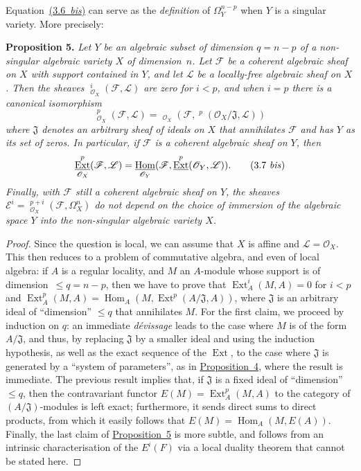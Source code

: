 \documentclass{article}
\newenvironment{itenv}[1]
  {\phantomsection\par\medskip\noindent\textbf{#1.}\itshape}
  {\medskip}
\newcommand{\scr}[1]{{\mathscr{#1}}}
\renewcommand{\leq}{\leqslant}
\DeclareMathOperator{\Ext}{Ext}
\DeclareMathOperator{\Hom}{Hom}
\DeclareMathOperator{\shExt}{\underline{Ext}}
\DeclareMathOperator{\shHom}{\underline{Hom}}
\newcommand{\oldpage}[1]{\marginpar{\footnotesize$\Big\vert$ \textit{p.~#1}}}
\begin{document}
Equation~\hyperref[3.6bis]{(3.6~\emph{bis})} can serve as the \emph{definition} of $\Omega_Y^{n-p}$ when $Y$ is a singular variety.
More precisely:

\begin{itenv}{Proposition 5}
\label{proposition5}
  Let $Y$ be an algebraic subset of dimension $q=n-p$ of a non-singular algebraic variety $X$ of dimension~$n$.
  Let $\scr{F}$ be a coherent algebraic sheaf on $X$ with support contained in $Y$, and let $\scr{L}$ be a locally-free algebraic sheaf on $X$.
  Then the sheaves $\shExt_{\scr{O}_X}^i(\scr{F},\scr{L})$ are zero for $i<p$, and when $i=p$ there is a canonical isomorphism
  \[
  \label{3.7}
    \shExt_{\scr{O}_X}^p(\scr{F},\scr{L}) = \shHom_{\scr{O}_X}(\scr{F},\shExt^p(\scr{O}_X/\mathfrak{J},\scr{L}))
  \tag{3.7}
  \]
  where $\mathfrak{J}$ denotes an arbitrary sheaf of ideals on $X$ that annihilates $\scr{F}$ and has $Y$ as its set of zeros.
  In particular, if $\scr{F}$ is a coherent algebraic sheaf on $Y$, then
  \[
  \label{3.7bis}
    \shExt_{\scr{O}_X}^p(\scr{F},\scr{L}) = \shHom_{\scr{O}_Y}(\scr{F},\shExt^p(\scr{O}_Y,\scr{L})).
  \tag{3.7 \emph{bis}}
  \]
  Finally, with $\scr{F}$ still a coherent algebraic sheaf on $Y$, the sheaves $\scr{E}^i=\shExt_{\scr{O}_X}^{p+i}(\scr{F},\Omega_X^n)$ do not depend on the choice of immersion of the algebraic space $Y$ into the non-singular algebraic variety $X$.
\end{itenv}

\begin{proof}
  Since the question is local, we can assume that $X$ is affine and $\scr{L}=\scr{O}_X$.
  This then reduces to a problem of commutative algebra, and even of local algebra:
  if $A$ is a regular locality, and $M$ an $A$-module whose support is of dimension~$\leq q=n-p$, then we have to prove that $\Ext_A^i(M,A)=0$ for $i<p$ and $\Ext_A^p(M,A)=\Hom_A(M,\Ext^p(A/\mathfrak{J},A))$, where $\mathfrak{J}$ is an arbitrary ideal of ``dimension'' $\leq q$ that annihilates $M$.
  For the first claim, we proceed by induction on $q$:
  an immediate \emph{d\'{e}vissage} leads to the case where $M$ is of the form $A/\mathfrak{J}$, and thus, by replacing $\mathfrak{J}$ by a smaller ideal and using the induction hypothesis, as well as the exact sequence of the $\Ext$, to the case where $\mathfrak{J}$ is generated by a ``system of parameters'', as in \hyperref[proposition4]{Proposition~4}, where the result is immediate.
  The previous result implies that, if $\mathfrak{J}$ is a
\oldpage{149-09}
  fixed ideal of ``dimension'' $\leq q$, then the contravariant functor $E(M)=\Ext_A^p(M,A)$ to the category of $(A/\mathfrak{J})$-modules is left exact;
  furthermore, it sends direct sums to direct products, from which it easily follows that $E(M)=\Hom_A(M,E(A))$.
  Finally, the last claim of \hyperref[proposition5]{Proposition~5} is more subtle, and follows from an intrinsic characterisation of the $E^i(F)$ via a local duality theorem that cannot be stated here.
\end{proof}
\end{document}
